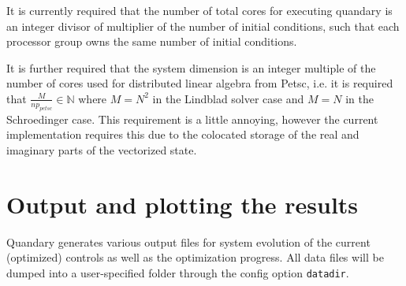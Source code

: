 \documentclass[11pt]{article}
\begin{document}
    It is currently required that the number of total cores for executing quandary is an integer divisor of multiplier of the number of initial conditions, such that each processor group owns the same number of initial conditions. 
    
    It is further required that the system dimension is an integer multiple of the number of cores used for distributed linear algebra from Petsc, i.e. it is required that $\frac{M}{np_{petsc}} \in \mathds{N}$ where $M=N^2$ in the Lindblad solver case and $M=N$ in the Schroedinger case. This requirement is a little
      annoying, however the current implementation requires this due to the
      colocated storage of the real and imaginary parts of the vectorized
      state.
 
\section{Output and plotting the results}
Quandary generates various output files for system evolution of the current (optimized) controls as well as the optimization progress. All data files will be dumped into a user-specified folder through the config option \texttt{datadir}. 
\end{document}
